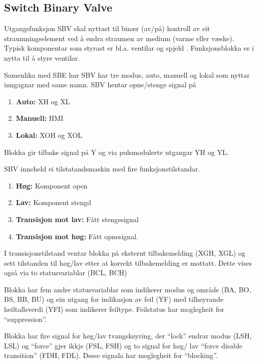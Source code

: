 \subsection{Switch Binary Valve}

Utgangsfunksjon \gls{SBV} skal nyttast til binær (av/på) kontroll av eit straumningselement ved å endra straumen av medium (varme eller væske). 
Typisk komponentar som styrast er bl.a. ventilar og spjeld \citep{IEC-63131}.
Funksjonsblokka er i nytta til å styre ventilar.

Samenlika med \gls{SBE} har \gls{SBV} har tre modus, auto, manuell og lokal som nyttar inngagnar med same namn.
\gls{SBV} hentar opne/stenge signal på
\begin{enumerate}
    \item \textbf{Auto:}        XH og XL  
    \item \textbf{Manuell:}     HMI
    \item \textbf{Lokal:}       XOH og XOL
\end{enumerate}
Blokka gir tilbake signal på Y og via pulsmodulerte utgangar YH og YL.

\gls{SBV} inneheld ei tilstatandsmaskin med fire funksjonstilstandar. 
\begin{enumerate}
    \item \textbf{Høg:}                 Komponent open
    \item \textbf{Lav:}                 Komponent stengd
    \item \textbf{Transisjon mot lav:}  Fått stengesignal
    \item \textbf{Transisjon mot høg:}  Fått opnesignal.
\end{enumerate}

I transisjonstilstand ventar blokka på eksternt tilbakemelding (XGH, XGL) 
og sett tilstanden til høg/lav etter at korrekt tilbakemelding er mottatt.
Dette vises også via to statusvariablar (BCL, BCH)

Blokka har fem andre statusvariablar som indikerer modus og område (BA, BO, BS, BB, BU) og
ein utgang for indikasjon av feil (YF) med tilhøyrande heiltallsverdi (YFI) som indikerer feiltype. \newline
Feilstatus har moglegheit for ``suppression''.

Blokka har fire signal for høg/lav tvangskøyring, der ``lock'' endrar modus (LSH, LSL) og ``force'' gjer ikkje (FSL, FSH)
og to signal for høg/ lav ``force disable transition'' (FDH, FDL).
Desse signala har moglegheit for ``blocking''.

